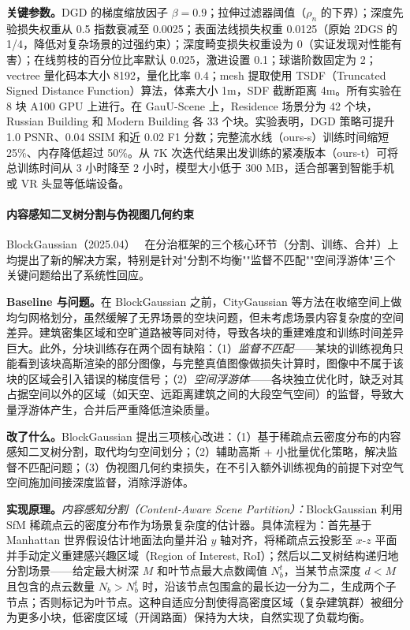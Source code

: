 \textbf{关键参数。}DGD 的梯度缩放因子 $\beta = 0.9$；拉伸过滤器阈值（$\rho_n$ 的下界）；深度先验损失权重从 0.5 指数衰减至 0.0025；表面法线损失权重 0.0125（原始 2DGS 的 1/4，降低对复杂场景的过强约束）；深度畸变损失权重设为 0（实证发现对性能有害）；在线剪枝的百分位比率默认 0.025，激进设置 0.1；球谐阶数固定为 2；vectree 量化码本大小 8192，量化比率 0.4；mesh 提取使用 TSDF（Truncated Signed Distance Function）算法，体素大小 1m，SDF 截断距离 4m。所有实验在 8 块 A100 GPU 上进行。在 GauU-Scene 上，Residence 场景分为 42 个块，Russian Building 和 Modern Building 各 33 个块。实验表明，DGD 策略可提升 1.0 PSNR、0.04 SSIM 和近 0.02 F1 分数；完整流水线（ours-s）训练时间缩短 25\%、内存降低超过 50\%。从 7K 次迭代结果出发训练的紧凑版本（ours-t）可将总训练时间从 3 小时降至 2 小时，模型大小低于 300 MB，适合部署到智能手机或 VR 头显等低端设备。

\paragraph{内容感知二叉树分割与伪视图几何约束}

BlockGaussian（2025.04）~\cite{2504_09048} 在分治框架的三个核心环节（分割、训练、合并）上均提出了新的解决方案，特别是针对"分割不均衡""监督不匹配""空间浮游体"三个关键问题给出了系统性回应。

\textbf{Baseline 与问题。}在 BlockGaussian 之前，CityGaussian 等方法在收缩空间上做均匀网格划分，虽然缓解了无界场景的空块问题，但未考虑场景内容复杂度的空间差异。建筑密集区域和空旷道路被等同对待，导致各块的重建难度和训练时间差异巨大。此外，分块训练存在两个固有缺陷：（1）\emph{监督不匹配}——某块的训练视角只能看到该块高斯渲染的部分图像，与完整真值图像做损失计算时，图像中不属于该块的区域会引入错误的梯度信号；（2）\emph{空间浮游体}——各块独立优化时，缺乏对其占据空间以外的区域（如天空、远距离建筑之间的大段空气空间）的监督，导致大量浮游体产生，合并后严重降低渲染质量。

\textbf{改了什么。}BlockGaussian 提出三项核心改进：（1）基于稀疏点云密度分布的内容感知二叉树分割，取代均匀空间划分；（2）辅助高斯 + 小批量优化策略，解决监督不匹配问题；（3）伪视图几何约束损失，在不引入额外训练视角的前提下对空气空间施加间接深度监督，消除浮游体。

\textbf{实现原理。}\emph{内容感知分割（Content-Aware Scene Partition）：}BlockGaussian 利用 SfM 稀疏点云的密度分布作为场景复杂度的估计器。具体流程为：首先基于 Manhattan 世界假设估计地面法向量并沿 $y$ 轴对齐，将稀疏点云投影至 $x$-$z$ 平面并手动定义重建感兴趣区域（Region of Interest, RoI）；然后以二叉树结构递归地分割场景——给定最大树深 $M$ 和叶节点最大点数阈值 $N_b^t$，当某节点深度 $d < M$ 且包含的点云数量 $N_b > N_b^t$ 时，沿该节点包围盒的最长边一分为二，生成两个子节点；否则标记为叶节点。这种自适应分割使得高密度区域（复杂建筑群）被细分为更多小块，低密度区域（开阔路面）保持为大块，自然实现了负载均衡。


